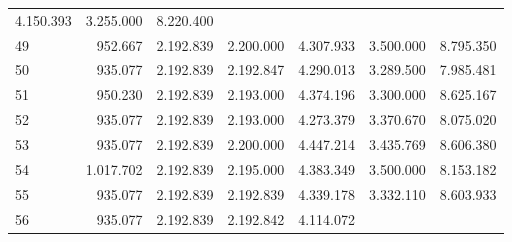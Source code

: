 \begin{tabular}{lllllll}
  \multicolumn{1}{r}{4.150.393} &
  \multicolumn{1}{r}{3.255.000} &
  \multicolumn{1}{r}{8.220.400} \\
\multicolumn{1}{l}{\hspace{1em}49} &
  \multicolumn{1}{|r}{952.667} &
  \multicolumn{1}{r}{2.192.839} &
  \multicolumn{1}{r}{2.200.000} &
  \multicolumn{1}{r}{4.307.933} &
  \multicolumn{1}{r}{3.500.000} &
  \multicolumn{1}{r}{8.795.350} \\
\multicolumn{1}{l}{\hspace{1em}50} &
  \multicolumn{1}{|r}{935.077} &
  \multicolumn{1}{r}{2.192.839} &
  \multicolumn{1}{r}{2.192.847} &
  \multicolumn{1}{r}{4.290.013} &
  \multicolumn{1}{r}{3.289.500} &
  \multicolumn{1}{r}{7.985.481} \\
\multicolumn{1}{l}{\hspace{1em}51} &
  \multicolumn{1}{|r}{950.230} &
  \multicolumn{1}{r}{2.192.839} &
  \multicolumn{1}{r}{2.193.000} &
  \multicolumn{1}{r}{4.374.196} &
  \multicolumn{1}{r}{3.300.000} &
  \multicolumn{1}{r}{8.625.167} \\
\multicolumn{1}{l}{\hspace{1em}52} &
  \multicolumn{1}{|r}{935.077} &
  \multicolumn{1}{r}{2.192.839} &
  \multicolumn{1}{r}{2.193.000} &
  \multicolumn{1}{r}{4.273.379} &
  \multicolumn{1}{r}{3.370.670} &
  \multicolumn{1}{r}{8.075.020} \\
\multicolumn{1}{l}{\hspace{1em}53} &
  \multicolumn{1}{|r}{935.077} &
  \multicolumn{1}{r}{2.192.839} &
  \multicolumn{1}{r}{2.200.000} &
  \multicolumn{1}{r}{4.447.214} &
  \multicolumn{1}{r}{3.435.769} &
  \multicolumn{1}{r}{8.606.380} \\
\multicolumn{1}{l}{\hspace{1em}54} &
  \multicolumn{1}{|r}{1.017.702} &
  \multicolumn{1}{r}{2.192.839} &
  \multicolumn{1}{r}{2.195.000} &
  \multicolumn{1}{r}{4.383.349} &
  \multicolumn{1}{r}{3.500.000} &
  \multicolumn{1}{r}{8.153.182} \\
\multicolumn{1}{l}{\hspace{1em}55} &
  \multicolumn{1}{|r}{935.077} &
  \multicolumn{1}{r}{2.192.839} &
  \multicolumn{1}{r}{2.192.839} &
  \multicolumn{1}{r}{4.339.178} &
  \multicolumn{1}{r}{3.332.110} &
  \multicolumn{1}{r}{8.603.933} \\
\multicolumn{1}{l}{\hspace{1em}56} &
  \multicolumn{1}{|r}{935.077} &
  \multicolumn{1}{r}{2.192.839} &
  \multicolumn{1}{r}{2.192.842} &
  \multicolumn{1}{r}{4.114.072} &

\end{tabular}
